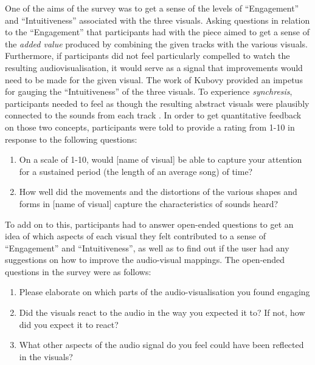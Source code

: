 \documentclass[../initial_thesis.tex]{subfiles}
\begin{document}


One of the aims of the survey was to get a sense of the levels of ``Engagement'' and ``Intuitiveness'' associated with the three visuals. Asking questions in relation to the ``Engagement'' that participants had with the piece aimed to get a sense of the \emph{added value} produced by combining the given tracks with the various visuals. Furthermore, if participants did not feel particularly compelled to watch the resulting audiovisualisation, it would serve as a signal that improvements would need to be made for the given visual. The work of Kubovy provided an impetus for gauging the ``Intuitiveness'' of the three visuals. To experience \emph{synchresis}, participants needed to feel as though the resulting abstract visuals were plausibly connected to the sounds from each track \cite{Kubovy2010}. In order to get quantitative feedback on those two concepts, participants were told to provide a rating from 1-10 in response to the following questions:

\begin{enumerate}
\item {On a scale of 1-10, would [name of visual] be able to capture your attention for a sustained period (the length of an average song) of time?}
\item {How well did the movements and the distortions of the various shapes and forms in [name of visual] capture the characteristics of sounds heard?}
\end{enumerate}

To add on to this, participants had to answer open-ended questions to get an idea of which aspects of each visual they felt contributed to a sense of ``Engagement'' and ``Intuitiveness'', as well as to find out if the user had any suggestions on how to improve the audio-visual mappings. The open-ended questions in the survey were as follows:

\begin{enumerate}
\item {Please elaborate on which parts of the audio-visualisation you found engaging}
\item {Did the visuals react to the audio in the way you expected it to? If not, how did you expect it to react?}
\item {What other aspects of the audio signal do you feel could have been reflected in the visuals?}
\end{enumerate}
\end{document}
